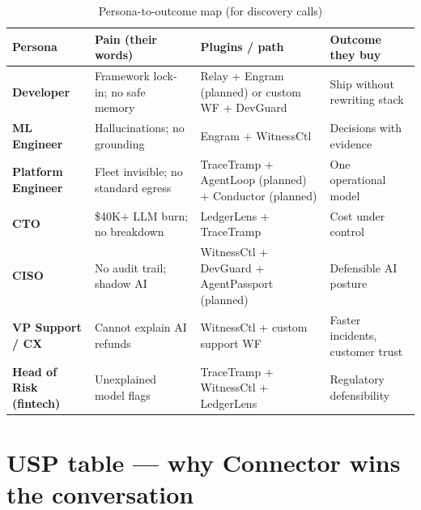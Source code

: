 \begin{table}[H]
\centering
\small
\renewcommand{\arraystretch}{1.35}
\begin{tabularx}{\textwidth}{@{}>{\bfseries}p{} p{} p{} X@{}}
\toprule
Persona & Pain (their words) & Plugins / path & Outcome they buy \\
\midrule
Developer & Framework lock-in; no safe memory & Relay + Engram (planned) or custom WF + DevGuard & Ship without rewriting stack \\
ML Engineer & Hallucinations; no grounding & Engram + WitnessCtl & Decisions with evidence \\
Platform Engineer & Fleet invisible; no standard egress & TraceTramp + AgentLoop (planned) + Conductor (planned) & One operational model \\
CTO & \$40K+ LLM burn; no breakdown & LedgerLens + TraceTramp & Cost under control \\
CISO & No audit trail; shadow AI & WitnessCtl + DevGuard + AgentPassport (planned) & Defensible AI posture \\
VP Support / CX & Cannot explain AI refunds & WitnessCtl + custom support WF & Faster incidents, customer trust \\
Head of Risk (fintech) & Unexplained model flags & TraceTramp + WitnessCtl + LedgerLens & Regulatory defensibility \\
\bottomrule
\end{tabularx}
\caption{Persona-to-outcome map (for discovery calls)}
\end{table}

\section{USP table --- why Connector wins the conversation}

